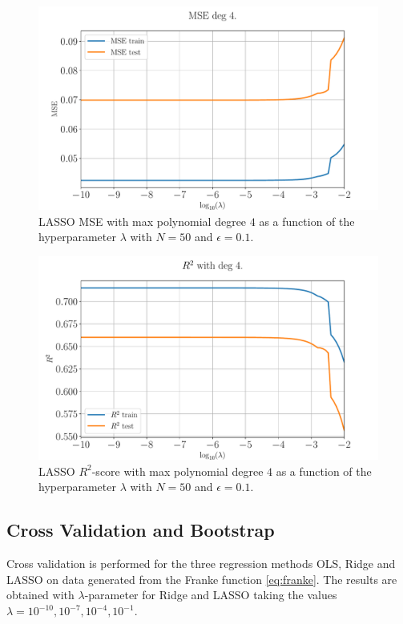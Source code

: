 \documentclass[%
reprint,
amsmath,amssymb,
aps,
pra,
]{revtex4-2}
\begin{document}
\begin{figure}[H]
	\centering
	\includegraphics[width=\linewidth]{Python/Figures/LASSO/LASSO_logMSE_no_scaling.pdf}
	\caption{LASSO MSE with max polynomial degree $4$ as a function of the hyperparameter $\lambda$ with $N=50$ and $\epsilon=0.1$.}
	\label{fig:LASSO_logMSE_degree}
\end{figure}
\begin{figure}[H]
	\centering
	\includegraphics[width=\linewidth]{Python/Figures/LASSO/LASSO_logR2_no_scaling.pdf}
	\caption{LASSO $R^2$-score with max polynomial degree $4$ as a function of the hyperparameter $\lambda$ with $N=50$ and $\epsilon=0.1$.}
	\label{fig:LASSO_logR2_degree}
\end{figure}


\subsection{Cross Validation and Bootstrap}
Cross validation is performed for the three regression methods OLS, Ridge and LASSO on data generated from the Franke function \eqref{eq:franke}. The results are obtained with \(\lambda\)-parameter for Ridge and LASSO taking the values \(\lambda = 10^{-10}, 10^{-7}, 10^{-4}, 10^{-1}\).
\end{document}
